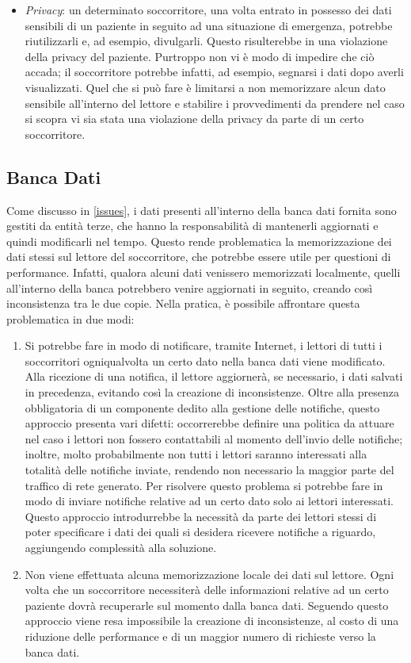 \documentclass[a4paper,12pt]{report}
\begin{document}
\begin{itemize}
	\item \emph{Privacy}: un determinato soccorritore, una volta entrato in possesso dei dati sensibili di un paziente in seguito ad una situazione di emergenza, potrebbe riutilizzarli e, ad esempio, divulgarli. Questo risulterebbe in una violazione della privacy del paziente. Purtroppo non vi è modo di impedire che ciò accada; il soccorritore potrebbe infatti, ad esempio, segnarsi i dati dopo averli visualizzati. Quel che si può fare è limitarsi a non memorizzare alcun dato sensibile all'interno del lettore e stabilire i provvedimenti da prendere nel caso si scopra vi sia stata una violazione della privacy da parte di un certo soccorritore.
\end{itemize}

\subsection{Banca Dati}

Come discusso in \autoref{issues}, i dati presenti all'interno della banca dati fornita sono gestiti da entità terze, che hanno la responsabilità di mantenerli aggiornati e quindi modificarli nel tempo. Questo rende problematica la memorizzazione dei dati stessi sul lettore del soccorritore, che potrebbe essere utile per questioni di performance. Infatti, qualora alcuni dati venissero memorizzati localmente, quelli all'interno della banca potrebbero venire aggiornati in seguito, creando così inconsistenza tra le due copie. Nella pratica, è possibile affrontare questa problematica in due modi:
\begin{enumerate}
	\item Si potrebbe fare in modo di notificare, tramite Internet, i lettori di tutti i soccorritori ogniqualvolta un certo dato nella banca dati viene modificato. Alla ricezione di una notifica, il lettore aggiornerà, se necessario, i dati salvati in precedenza, evitando così la creazione di inconsistenze. Oltre alla presenza obbligatoria di un componente dedito alla gestione delle notifiche, questo approccio presenta vari difetti: occorrerebbe definire una politica da attuare nel caso i lettori non fossero contattabili al momento dell'invio delle notifiche; inoltre, molto probabilmente non tutti i lettori saranno interessati alla totalità delle notifiche inviate, rendendo non necessario la maggior parte del traffico di rete generato. Per risolvere questo problema si potrebbe fare in modo di inviare notifiche relative ad un certo dato solo ai lettori interessati. Questo approccio introdurrebbe la necessità da parte dei lettori stessi di poter specificare i dati dei quali si desidera ricevere notifiche a riguardo, aggiungendo complessità alla soluzione.
	\item Non viene effettuata alcuna memorizzazione locale dei dati sul lettore. Ogni volta che un soccorritore necessiterà delle informazioni relative ad un certo paziente dovrà recuperarle sul momento dalla banca dati. Seguendo questo approccio viene resa impossibile la creazione di inconsistenze, al costo di una riduzione delle performance e di un maggior numero di richieste verso la banca dati.
\end{enumerate} 
\end{document}
